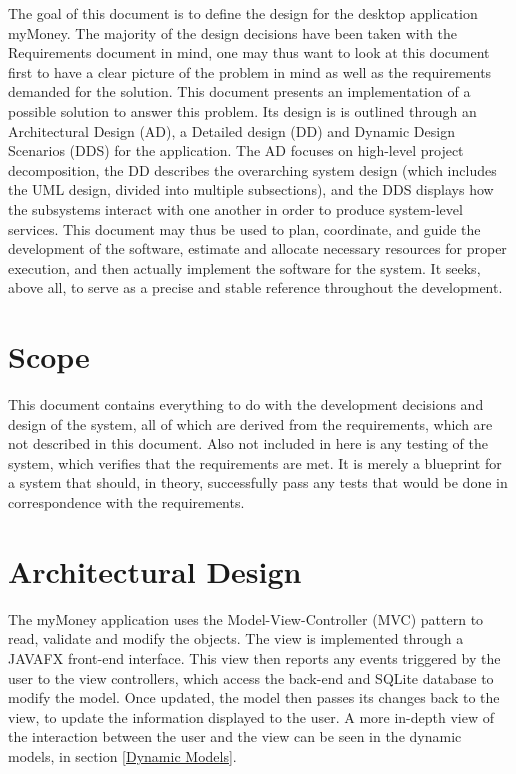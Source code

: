 \documentclass[12pt]{article}
\begin{document}
The goal of this document is to define the design for the desktop application myMoney. The majority of the design decisions have been taken     with the Requirements document in mind, one may thus want to look at this document first to have a clear picture of the problem in mind as well as the requirements demanded for the solution. This document presents an implementation of a possible solution to answer this problem. Its design is is outlined through an Architectural Design (AD), a Detailed design (DD) and Dynamic Design Scenarios (DDS) for the application. The AD focuses on high-level project decomposition, the DD describes the overarching system design (which includes the UML design, divided into multiple subsections), and the DDS displays how the subsystems interact with one another in order to produce system-level services. This document may thus be used to plan, coordinate, and guide the development of the software, estimate and allocate necessary resources for proper execution, and  then actually implement the software for the system. It seeks, above all, to serve as a precise and stable reference throughout the development.

\section{Scope}

This document contains everything to do with the development decisions and design of the system, all of which are derived from the requirements, which are not described in this document. Also not included in here is any testing of the system, which verifies that the requirements are met. It is merely a blueprint for a system that should, in theory, successfully pass any tests that would be done in correspondence with the requirements.

\section{Architectural Design} \label{sec:arch}

The myMoney application uses the Model-View-Controller (MVC) pattern to read, validate and modify the objects. The view is implemented through a JAVAFX front-end interface. This view then reports any events triggered by the user to the view controllers, which access the back-end and SQLite database to modify the model. Once updated, the model then passes its changes back to the view, to update the information displayed to the user. A more in-depth view of the interaction between the user and the view can be seen in the dynamic models, in section \ref{Dynamic Models}.
\end{document}
